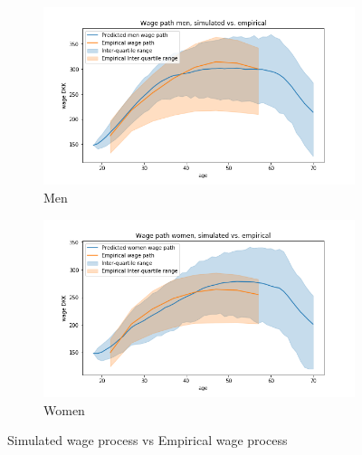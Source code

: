 \begin{figure}[ht]

\begin{subfigure}{.5\textwidth}
  \centering
  \includegraphics[width=1\linewidth]{figures/simulated_wage_path_variance_optimized_parameters_women.png}
  \caption{Men}
  \label{fig:sub1}
\end{subfigure}%
\begin{subfigure}{.5\textwidth}
  \centering
  \includegraphics[width=1\linewidth]{figures/simulated_wage_path_variance_optimized_parameters_men.png}
  \caption{Women}
  \label{fig:sub2_wage_path}
\end{subfigure}
    \caption{Simulated wage process vs Empirical wage process}
    \label{fig:sim_wage_vs_empirical_wage}
\end{figure}


